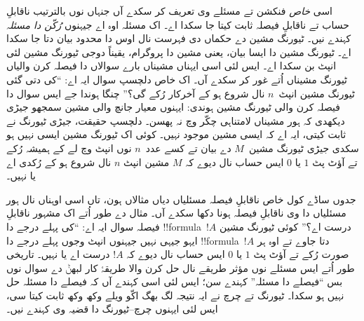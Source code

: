 \documentclass[../../../include/open-logic-section]{subfiles}
\begin{document}
اسی \emph{خاص}
فنکشن تے مسئلے
وی تعریف کر
سکدے آں جنہاں
نوں بالترتیب
ناقابلِ حساب
تے ناقابلِ فیصلہ
ثابت کیتا جا
سکدا اے۔ اک
مسئلہ اوہ اے جیہنوں
\emph{رُکّن دا مسئلہ}
کہندے نیں۔ ٹیورنگ
مشین دے حکماں
دی فہرست نال
اوس دا محدود
بیان دتا جا
سکدا اے۔ ٹیورنگ
مشین دا ایسا
بیان، یعنی
مشین دا پروگرام،
یقیناً دوجی
ٹیورنگ مشین
لئی انپٹ
بن سکدا اے۔
ایس لئی اسی
ایہناں مشیناں
بارے سوالاں
دا فیصلہ کرن
والیاں ٹیورنگ
مشیناں اُتے
غور کر سکدے
آں۔ اک خاص
دلچسپ سوال
ایہ اے:
“کی دتی گئی
ٹیورنگ مشین
انپٹ~$n$
نال شروع ہو
کے آخرکار
رُکے گی؟”
چنگا ہوندا جے
ایس سوال دا
فیصلہ کرن
والی ٹیورنگ
مشین ہوندی:
ایہنوں معیار
جانچ والی
مشین سمجھو
جیڑی دیکھدی
کہ ہور مشیناں
لامتناہی چکّر
وچ نہ پھسن۔
دلچسپ حقیقت،
جیڑی ٹیورنگ
نے ثابت کیتی،
ایہ اے کہ
ایسی مشین
موجود نہیں۔
کوئی اک ٹیورنگ
مشین ایسی
نہیں ہو سکدی
جیڑی ٹیورنگ
مشین~$M$
دے بیان تے
کسے عدد~$n$
نوں انپٹ
وچ لے کے
ہمیشہ رُکے
تے آؤٹ پٹ
$1$ یا $0$
ایس حساب نال
دیوے کہ
$M$ مشین
انپٹ $n$
نال شروع ہو
کے رُکدی
اے یا نہیں۔

جدوں ساڈے کول
خاص ناقابلِ
فیصلہ مسئلیاں
دیاں مثالاں
ہون، تاں اسی
اوہناں نال ہور
مسئلیاں دا وی
ناقابلِ فیصلہ
ہونا دکھا سکدے
آں۔ مثال دے
طور اُتے اک
مشہور ناقابلِ
فیصلہ سوال
ایہ اے: “کی
پہلے درجے دا
!!{formula}~$!A$
درست اے؟”
کوئی ٹیورنگ مشین ایہو جیہی نہیں
جیہنوں انپٹ وجوں پہلے درجے دا
!!{formula}~$!A$ دتا جاوے
تے اوہ ہر صورت رُکے تے
آؤٹ پٹ $1$
یا $0$ ایس
حساب نال
دیوے کہ $!A$
درست اے
یا نہیں۔
تاریخی طور
اُتے ایس
مسئلے نوں
مؤثر طریقے
نال حل کرن
والا طریقۂ
کار لبھݨ
دے سوال
نوں بس
“فیصلے دا
مسئلہ”
کہندے سن؛
ایس لئی
اسی کہندے
آں کہ
فیصلے دا
مسئلہ حل
نہیں ہو
سکدا۔
ٹیورنگ
تے چرچ
نے ایہ
نتیجہ لگ
بھگ اکّو
ویلے وکھ
وکھ ثابت
کیتا سی،
ایس لئی
ایہنوں
چرچ--ٹیورنگ
دا قضیہ
وی کہندے
نیں۔
\end{document}
